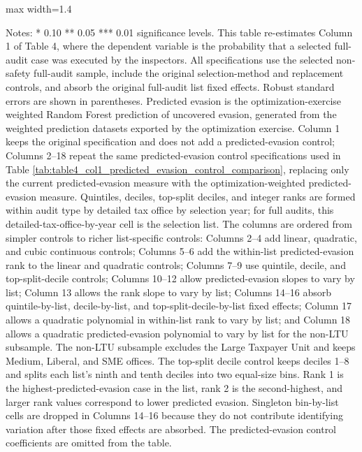 \documentclass{article}
\newcommand{\OutPath}{Output/}%
\newcommand{\OutPath}{../Output/}%
\begin{document}
\begin{landscape}
\begin{table}[H]\centering
\begin{adjustbox}{max width=1.4\textwidth}
\begin{threeparttable}
\caption{Table 4: Main Results Probability of Execution Varying Predicted Evasion Control Specification, Optimization-Weighted Predictions}
\label{tab:table4_col1_predicted_evasion_control_comparison_optimization_weighted}

\footnotesize


\begin{tablenotes}[flushleft]
\footnotesize
\item Notes: * 0.10 ** 0.05 *** 0.01 significance levels. This table re-estimates Column 1 of Table 4, where the dependent variable is the probability that a selected full-audit case was executed by the inspectors. All specifications use the selected non-safety full-audit sample, include the original selection-method and replacement controls, and absorb the original full-audit list fixed effects. Robust standard errors are shown in parentheses. Predicted evasion is the optimization-exercise weighted Random Forest prediction of uncovered evasion, generated from the weighted prediction datasets exported by the optimization exercise. Column 1 keeps the original specification and does not add a predicted-evasion control; Columns 2--18 repeat the same predicted-evasion control specifications used in Table \ref{tab:table4_col1_predicted_evasion_control_comparison}, replacing only the current predicted-evasion measure with the optimization-weighted predicted-evasion measure. Quintiles, deciles, top-split deciles, and integer ranks are formed within audit type by detailed tax office by selection year; for full audits, this detailed-tax-office-by-year cell is the selection list. The columns are ordered from simpler controls to richer list-specific controls: Columns 2--4 add linear, quadratic, and cubic continuous controls; Columns 5--6 add the within-list predicted-evasion rank to the linear and quadratic controls; Columns 7--9 use quintile, decile, and top-split-decile controls; Columns 10--12 allow predicted-evasion slopes to vary by list; Column 13 allows the rank slope to vary by list; Columns 14--16 absorb quintile-by-list, decile-by-list, and top-split-decile-by-list fixed effects; Column 17 allows a quadratic polynomial in within-list rank to vary by list; and Column 18 allows a quadratic predicted-evasion polynomial to vary by list for the non-LTU subsample. The non-LTU subsample excludes the Large Taxpayer Unit and keeps Medium, Liberal, and SME offices. The top-split decile control keeps deciles 1--8 and splits each list's ninth and tenth deciles into two equal-size bins. Rank 1 is the highest-predicted-evasion case in the list, rank 2 is the second-highest, and larger rank values correspond to lower predicted evasion. Singleton bin-by-list cells are dropped in Columns 14--16 because they do not contribute identifying variation after those fixed effects are absorbed. The predicted-evasion control coefficients are omitted from the table.

\end{tablenotes}
\end{threeparttable}
\end{adjustbox}
\end{table}
\end{landscape}
\end{document}
